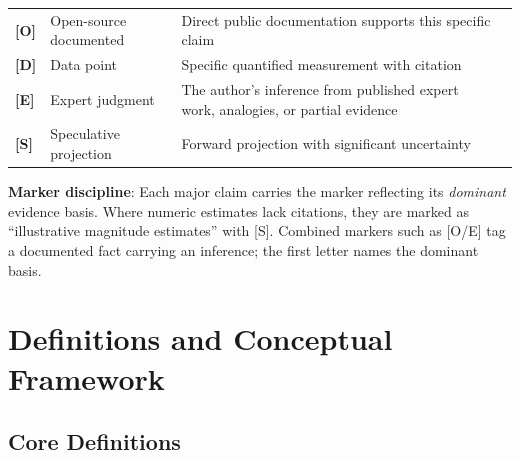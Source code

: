 \documentclass[11pt,letterpaper]{article}
\begin{document}
\begin{defbox}
\begin{tabularx}{\linewidth}{ZY{0.28}Y{0.83}Y{1.89}}
\textbf{[O]} & Open-source documented & Direct public documentation supports this specific claim \\
\textbf{[D]} & Data point & Specific quantified measurement with citation \\
\textbf{[E]} & Expert judgment & The author's inference from published expert work, analogies, or partial evidence \\
\textbf{[S]} & Speculative projection & Forward projection with significant uncertainty \\
\end{tabularx}

\textbf{Marker discipline}: Each major claim carries the marker reflecting its \textit{dominant} evidence basis. Where numeric estimates lack citations, they are marked as ``illustrative magnitude estimates'' with [S]. Combined markers such as [O/E] tag a documented fact carrying an inference; the first letter names the dominant basis.
\end{defbox}

\section{Definitions and Conceptual Framework}

\subsection{Core Definitions}
\end{document}
